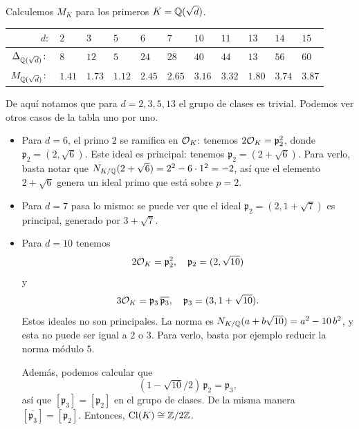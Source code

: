 \begin{ejemplo}
  Calculemos $M_K$ para los primeros $K = \mathbb{Q} (\sqrt{d})$.

  \begin{center}\renewcommand{\arraystretch}{1.5}
    \begin{tabular}{rx{1cm}x{1cm}x{1cm}x{1cm}x{1cm}x{1cm}x{1cm}x{1cm}x{1cm}x{1cm}}
      \hline
      $d\colon$ & $2$ & $3$ & $5$ & $6$ & $7$ & $10$ & $11$ & $13$ & $14$ & $15$ \tabularnewline
      \hline
      $\Delta_{\mathbb{Q} (\sqrt{d})}\colon$ & $8$ & $12$ & $5$ & $24$ & $28$ & $40$ & $44$ & $13$ & $56$ & $60$ \tabularnewline
      \hline
      $M_{\mathbb{Q} (\sqrt{d})}\colon$ & $1.41$ & $1.73$ & $1.12$ & $2.45$ & $2.65$ & $3.16$ & $3.32$ & $1.80$ & $3.74$ & $3.87$ \tabularnewline
      \hline
    \end{tabular}
  \end{center}

  De aquí notamos que para $d = 2,3,5,13$ el grupo de clases es trivial. Podemos
  ver otros casos de la tabla uno por uno.

  \begin{itemize}
  \item Para $d = 6$, el primo $2$ se ramifica en $\mathcal{O}_K$: tenemos
    $2\mathcal{O}_K = \mathfrak{p}_2^2$, donde $\mathfrak{p}_2 = (2, \sqrt{6})$.
    Este ideal es principal: tenemos $\mathfrak{p}_2 = (2 + \sqrt{6})$.
    Para verlo, basta notar que
    $N_{K/\mathbb{Q}} (2 + \sqrt{6}) = 2^2 - 6\cdot 1^2 = -2$, así que el elemento
    $2 + \sqrt{6}$ genera un ideal primo que está sobre $p = 2$.

  \item Para $d = 7$ pasa lo mismo: se puede ver que el ideal
    $\mathfrak{p}_2 = (2, 1 + \sqrt{7})$ es principal, generado por
    $3 + \sqrt{7}$.

  \item Para $d = 10$ tenemos
    $$2\mathcal{O}_K = \mathfrak{p}_2^2, \quad \mathfrak{p}_2 = (2, \sqrt{10})$$
    y
    $$3\mathcal{O}_K = \mathfrak{p}_3\,\overline{\mathfrak{p}_3}, \quad \mathfrak{p}_3 = (3, 1+\sqrt{10}).$$
    Estos ideales no son principales. La norma es
    $N_{K/\mathbb{Q}} (a + b\sqrt{10}) = a^2 - 10\,b^2$, y esta no puede ser igual
    a $2$ o $3$. Para verlo, basta por ejemplo reducir la norma módulo $5$.

    Además, podemos calcular que
    $$(1 - \sqrt{10}/2)\,\mathfrak{p}_2 = \mathfrak{p}_3,$$ así que
    $[\mathfrak{p}_3] = [\mathfrak{p}_2]$ en el grupo de clases. De la misma manera
    $[\overline{\mathfrak{p}_3}] = [\mathfrak{p}_2]$.
    Entonces, $\operatorname{Cl} (K) \cong \mathbb{Z}/2\mathbb{Z}$.


\end{itemize}
\end{ejemplo}
